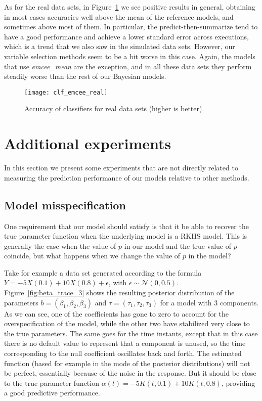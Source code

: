 As for the real data sets, in Figure~\ref{fig:clf_emcee_real} we see positive results in general, obtaining in most cases accuracies well above the mean of the reference models, and sometimes above most of them. In particular, the predict-then-summarize tend to have a good performance and achieve a lower standard error across executions, which is a trend that we also saw in the simulated data sets. However, our variable selection methods seem to be a bit worse in this case. Again, the models that use \textit{emcee\_mean} are the exception, and in all these data sets they perform steadily worse than the rest of our Bayesian models.

\begin{figure}[ht!]
  \centering
  \texttt{[image: clf\_emcee\_real]}
  \caption{Accuracy of classifiers for real data sets (higher is better).}\label{fig:clf_emcee_real}
\end{figure}


\section{Additional experiments}

In this section we present some experiments that are not directly related to measuring the prediction performance of our models relative to other methods.

\subsection*{Model misspecification}

One requirement that our model should satisfy is that it be able to recover the true parameter function when the underlying model is a RKHS model. This is generally the case when the value of \(p\) in our model and the true value of \(p\) coincide, but what happens when we change the value of \(p\) in the model?

Take for example a data set generated according to the formula \(Y=-5X(0.1) + 10X(0.8) + \epsilon\), with \(\epsilon\sim \mathcal N(0, 0.5)\). Figure~\ref{fig:beta_trace_3} shows the resulting posterior distribution of the parameters \(b=(\beta_1, \beta_2, \beta_3)\) and \(\tau=(\tau_1, \tau_2, \tau_3)\) for a model with 3 components. As we can see, one of the coefficients has gone to zero to account for the overspecification of the model, while the other two have stabilized very close to the true parameters. The same goes for the time instants, except that in this case there is no default value to represent that a component is unused, so the time corresponding to the null coefficient oscillates back and forth. The estimated function (based for example in the mode of the posterior distributions) will not be perfect, essentially because of the noise in the response. But it should be close to the true parameter function \(\alpha(t)=-5K(t, 0.1) + 10K(t, 0.8)\), providing a good predictive performance.

